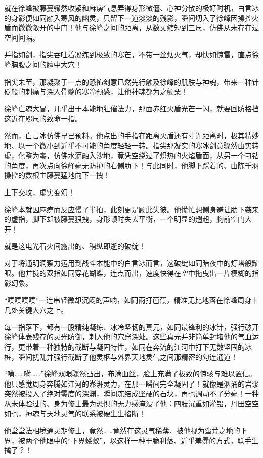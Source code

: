 就在徐峰被藤蔓骤然收紧和麻痹气息弄得身形微僵、心神分散的极好时机，白言冰的身影便如同融入寒风的幽灵，只留下一道淡淡的残影，瞬间切入了徐峰因操控火盾而微微敞开的中门！他与徐峰之间的距离，从数丈缩短到三尺，仿佛从未存在过空间间隔。

并指如剑，指尖吞吐着凝练到极致的寒芒，不带一丝烟火气，却快如惊雷，直点徐峰胸腹之间的膻中大穴！

指尖未至，那凝聚于一点的恐怖剑意已然先行触及徐峰的肌肤与神魂，带来一种针砭般的刺痛与深入骨髓的寒冷预感，让他神魂都为之颤栗！

徐峰亡魂大冒，几乎出于本能地狂催法力，那面赤红火盾光芒一闪，就要回防格挡这近在咫尺的致命一指。

然而，白言冰仿佛早已预料。他点出的手指在距离火盾还有寸许距离时，极其精妙地、以一个微小到近乎不可能的角度轻轻一转。指尖那凝实的寒冰剑意骤然由实转虚，化整为零，仿佛水滴融入沙地，竟凭空绕过了炽热的火焰盾面，从另一个刁钻的角度，再次点向徐峰毫无防护的右侧肋下！与此同时，他脚下踩着的、由陈千羽操控的数根主藤蔓猛地向下一拽！

上下交攻，虚实变幻！

徐峰本就因麻痹而反应慢了半拍，此刻更是顾此失彼。他慌忙想侧身避让肋下袭来的虚指，脚下却被藤蔓狠拽，身形顿时失去平衡，一个明显的趔趄，胸前空门大开！

就是这电光石火间露出的、稍纵即逝的破绽！

对于将通明洞察力运用到战斗本能中的白言冰而言，这破绽如同暗夜中的灯塔般耀眼。他并拢的双指如同穿花蝴蝶，连点而出，速度快得在空中拖曳出一片模糊的指影幻象。

“噗噗噗噗”一连串轻微却沉闷的声响，如同雨打芭蕉，精准无比地落在徐峰周身十几处关键大穴之上。

每一指落下，都有一股精纯凝练、冰冷坚韧的真元，如同最锋利的冰针，强行破开徐峰体表残存的灵光防御，刺入他的穴窍深处。这些真元并非简单封堵他的气血运行，更带着一种独特的截断与凝固特性，如同在奔流的江河中打下无数坚固的冰桩，瞬间扰乱并强行截断了他灵枢与外界天地灵气之间那精密的勾连通道！

“嗬……嗬……”徐峰双眼骤然凸出，布满血丝，脸上充满了极致的惊骇与难以置信。他只感觉周身奔腾如江河的澎湃灵力，在那一瞬间完全凝固了！就像是汹涌的岩浆突然被投入了绝对零度的深渊，瞬间冻结成坚硬的石块，再也调动不了分毫！一种从未体验过的、身为修士最为恐惧的无力感淹没了他：四肢沉重如灌铅，丹田空空如也，神魂与天地灵气的联系被硬生生掐断！

他堂堂法相境通灵期修士，竟然……竟然在这灵气稀薄、被他视为蛮荒之地的下界，被两个他眼中的“下界蝼蚁”，以这样一种干脆利落、近乎羞辱的方式，联手生擒了？！

